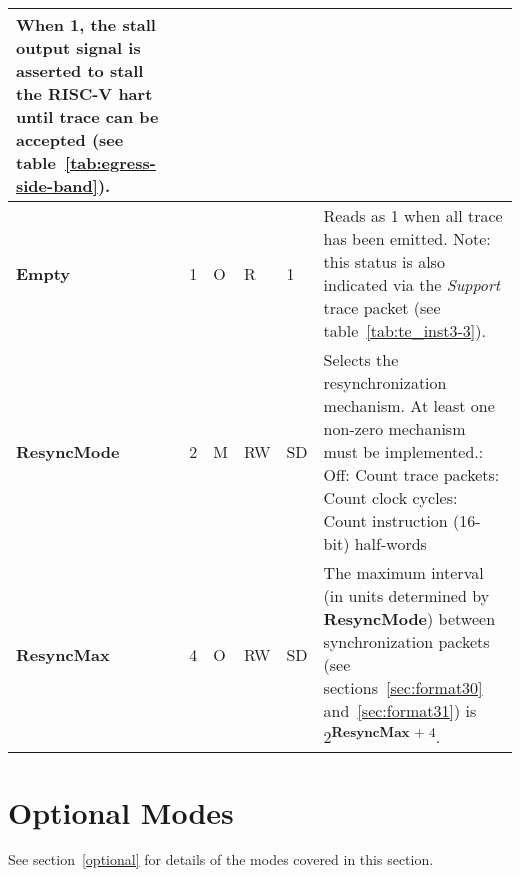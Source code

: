 \begin{table}[htp]
\begin{tabulary}{\textwidth}{|l|l|l|l|l|p{90mm}|}
      When 1, the \textbf{stall} output signal is asserted to stall the RISC-V hart until trace can be accepted (see table~\ref{tab:egress-side-band}).\\
    \hline
    \textbf{Empty} & 1 & O & R & 1 & Reads as 1 when all trace has been emitted.  Note: this status is also indicated via the 
      \textit{Support} trace packet (see table~\ref{tab:te_inst3-3}).\\
    \hline
    \textbf{ResyncMode} & 2 & M & RW & SD & Selects the resynchronization mechanism.  At least one non-zero mechanism must be implemented.: Off: Count trace packets: Count clock cycles: Count instruction (16-bit) half-words\\
    \hline
    \textbf{ResyncMax} & 4 & O & RW & SD & The maximum interval (in units determined by \textbf{ResyncMode}) between synchronization packets
    (see sections~\ref{sec:format30} and~\ref{sec:format31}) is 2\textsuperscript{\textbf{ResyncMax} + 4}.\\
    \hline
  \end{tabulary}
\end{table}

\FloatBarrier
\section{Optional Modes} \label{sec:ctl-modes}

See section~\ref{optional} for details of the modes covered in this section.

